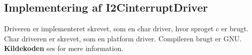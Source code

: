 \documentclass[Softwaredesign/Softwaredesign\_main.tex]{subfiles}
\begin{document}
\subsection{Implementering af I2C\-interruptDriver} \label{sec:I2C_interruptDriver_implementering_bilag}
Driveren er implementeret skrevet, som en char driver, hvor sproget c er brugt. Char driveren er skrevet, som en platform driver. Compileren brugt er GNU. \textbf{Kildekoden} ses for mere information.
\end{document}
